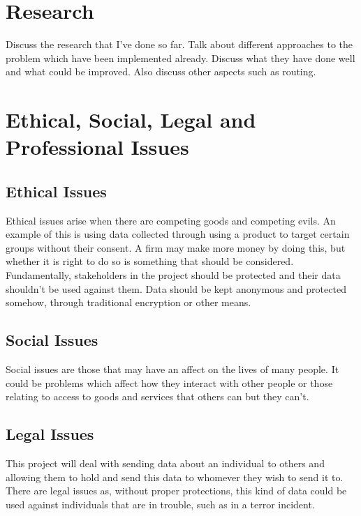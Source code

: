 \documentclass{report}
\begin{document}
\chapter{Research}

Discuss the research that I've done so far. Talk about different approaches to the 
problem which have been implemented already. Discuss what they have done well and what 
could be improved. Also discuss other aspects such as routing.

\chapter{Ethical, Social, Legal and Professional Issues}

\section{Ethical Issues}

Ethical issues arise when there are competing goods and competing evils. An example of this 
is using data collected through using a product to target certain groups without their consent. 
A firm may make more money by doing this, but whether it is right to do so is something that 
should be considered. Fundamentally, stakeholders in the project should be protected and their 
data shouldn't be used against them. Data should be kept anonymous and protected somehow, through 
traditional encryption or other means. 

\section{Social Issues}

Social issues are those that may have an affect on the lives of many people. It could be problems which 
affect how they interact with other people or those relating to access to goods and services that others can 
but they can't. 

\section{Legal Issues}

This project will deal with sending data about an individual to others and allowing them to hold and send this 
data to whomever they wish to send it to. There are legal issues as, without proper protections, this kind of 
data could be used against individuals that are in trouble, such as in a terror incident. 
\end{document}
